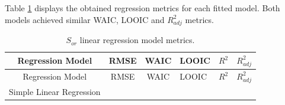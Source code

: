 \documentclass[english,msc,numbers]{coppe}
\begin{document}
  Table \ref{tab:sor-regression-metrics} displays the obtained regression metrics for each fitted model. Both models achieved similar WAIC, LOOIC and \(R_{adj}^2\) metrics.
  \begin{longtable}[]{@{}ccclll@{}}
  \caption{\label{tab:sor-regression-metrics} \(S_{or}\) linear regression model metrics.}\tabularnewline
  \toprule
  \begin{minipage}[b]{0.36\columnwidth}\centering
  Regression Model\strut
  \end{minipage} & \begin{minipage}[b]{0.08\columnwidth}\centering
  RMSE\strut
  \end{minipage} & \begin{minipage}[b]{0.11\columnwidth}\centering
  WAIC\strut
  \end{minipage} & \begin{minipage}[b]{0.09\columnwidth}\raggedright
  LOOIC\strut
  \end{minipage} & \begin{minipage}[b]{0.06\columnwidth}\raggedright
  \(R^2\)\strut
  \end{minipage} & \begin{minipage}[b]{0.13\columnwidth}\raggedright
  \(R_{adj}^2\)\strut
  \end{minipage}\tabularnewline
  \midrule
  \endfirsthead
  \toprule
  \begin{minipage}[b]{0.36\columnwidth}\centering
  Regression Model\strut
  \end{minipage} & \begin{minipage}[b]{0.08\columnwidth}\centering
  RMSE\strut
  \end{minipage} & \begin{minipage}[b]{0.11\columnwidth}\centering
  WAIC\strut
  \end{minipage} & \begin{minipage}[b]{0.09\columnwidth}\raggedright
  LOOIC\strut
  \end{minipage} & \begin{minipage}[b]{0.06\columnwidth}\raggedright
  \(R^2\)\strut
  \end{minipage} & \begin{minipage}[b]{0.13\columnwidth}\raggedright
  \(R_{adj}^2\)\strut
  \end{minipage}\tabularnewline
  \midrule
  \endhead
  \begin{minipage}[t]{0.36\columnwidth}\centering
  Simple Linear Regression\strut
  \end{minipage} & \begin{minipage}[t]{0.08\columnwidth}\centering

\end{minipage}
\end{longtable}
\end{document}
